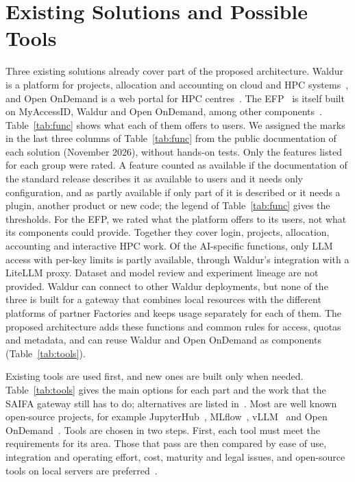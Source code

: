 \documentclass[conference,a4paper]{IEEEtran}
\newif\ifizmene
\DeclareRobustCommand{\chg}[1]{#1}
\DeclareRobustCommand{\roz}[1]{#1}
\DeclareRobustCommand{\nov}[1]{#1}
\DeclareRobustCommand{\tri}[1]{#1}
\DeclareRobustCommand{\fin}[1]{\ifizmene{\color{finalna}#1}\else#1\fi}
\begin{document}
\section{\chg{Existing Solutions and} Possible Tools}
\label{sec:tools}

\chg{Three existing solutions already cover part of the} \nov{proposed architecture}\roz{. Waldur is a platform for projects, allocation and accounting on cloud and HPC systems}~\cite{waldur_docs}\roz{, and Open OnDemand is a web portal for HPC centres}~\cite{hudak2018ood}. \roz{The EFP}~\cite{eurohpc_efp} \roz{is itself built on MyAccessID, Waldur and Open OnDemand}\nov{, among other components}~\cite{nortamo2025efp}. \roz{Table~\ref{tab:func} shows what each of them offers to users.} \nov{We assigned the marks \tri{in the last three columns of Table~\ref{tab:func}} from the public documentation of each solution (\fin{November} 2026), without hands-on tests.} \fin{Only the features listed for each group were rated. A feature counted as available if the documentation of the standard release describes it as available to users and it needs only configuration, and as partly available if only part of it is described or it needs a plugin, another product or new code; the legend of Table~\ref{tab:func} gives the thresholds.} \nov{For the EFP, we rated what the platform offers to its users, not what its components could provide.} \nov{Together they cover login, projects, allocation, accounting and interactive HPC work.} \nov{Of the AI-specific functions, only LLM access with per-key limits is partly available, \tri{through Waldur's integration with a LiteLLM proxy. Dataset} and model review and experiment lineage are not provided. Waldur can connect to other Waldur deployments, but none of the three is built for a gateway that combines local resources with the different platforms of partner Factories and keeps usage separately for each of them. The proposed architecture adds these functions and common rules for access, quotas and metadata\fin{, and can reuse Waldur and Open OnDemand as components (Table~\ref{tab:tools})}.}

\chg{Existing tools are used first, and new ones are built only when needed.} Table~\ref{tab:tools} gives the main \roz{options} for each part and the work that \nov{the SAIFA} gateway still has to do\chg{; alternatives are listed in~\cite{saifa_d31}}. Most are well known open-source projects, for example JupyterHub~\cite{kluyver2016jupyter,jupyterhub_docs}, MLflow~\cite{zaharia2018mlflow}, vLLM~\cite{kwon2023vllm} and Open OnDemand~\cite{hudak2018ood}. Tools are chosen in two steps\nov{. \tri{First,} each tool must meet the requirements for its area. \tri{Those} that pass are \tri{then} compared by ease of use, integration and operating effort, cost, maturity and legal issues, \tri{and open-source tools on local servers are preferred}~\cite{saifa_d31}}.
\end{document}
